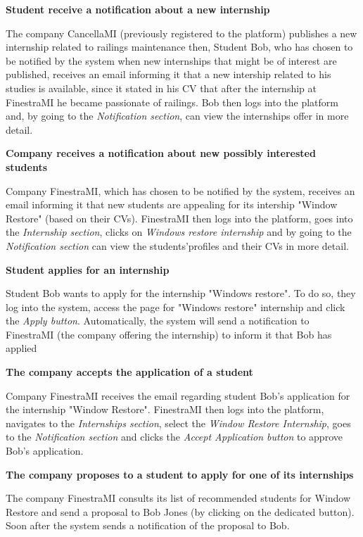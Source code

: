 			\textbf{Student receive a notification about a new internship}
			\begin{flushleft}
				The company CancellaMI (previously registered to the platform) publishes a new internship related to railings maintenance then, Student Bob, who has chosen to be notified by the system when new internships that might be of interest are published, receives an email informing it that a new intership related to his studies is available, since it stated in his CV that after the internship at FinestraMI he became passionate of railings. Bob then logs into the platform and, by going to the \emph{Notification section}, can view the internships offer in more detail.
			\end{flushleft}
			\textbf{Company receives a notification about new possibly interested students}
			\begin{flushleft}
				Company FinestraMI, which has chosen to be notified by the system, receives an email informing it that new students are appealing for its intership "Window Restore" (based on their CVs). FinestraMI then logs into the platform, goes into the \emph{Internship section}, clicks on \emph{Windows restore internship} and by going to the \emph{Notification section} can view the students'profiles and their CVs in more detail.
			\end{flushleft}
			\textbf{Student applies for an internship}
			\begin{flushleft}
				Student Bob wants to apply for the internship "Windows restore". To do so, they log into the system, access the page for "Windows restore" internship and click the \emph{Apply button}. Automatically, the system will send a notification to FinestraMI (the company offering the internship) to inform it that Bob has applied
			\end{flushleft}
			\textbf{The company accepts the application of a student}
			\begin{flushleft}
				Company FinestraMI receives the email regarding student Bob's application for the internship "Window Restore". FinestraMI then logs into the platform, navigates to the \emph{Internships section}, select the \emph{Window Restore Internship}, goes to the \emph{Notification section} and clicks the \emph{Accept Application button} to approve Bob's application.
			\end{flushleft}
			\textbf{The company proposes to a student to apply for one of its internships}
			\begin{flushleft}
				The company FinestraMI consults its list of recommended students for Window Restore and send a proposal to Bob Jones (by clicking on the dedicated button). Soon after the system sends a notification of the proposal to Bob. 
			\end{flushleft}
